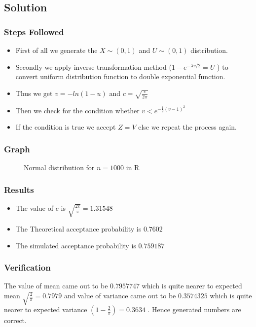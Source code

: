\documentclass[10pt]{article}
\begin{document}
\subsection{Solution}
\subsubsection{Steps Followed}
\begin{itemize}
\item First of all we generate the  $ X \sim  (0,1) $ and $ U \sim  (0,1) $ distribution.
\item Secondly we apply inverse transformation method ($ 1 - e^{-{\lambda}v/2} = U $ )   to convert uniform distribution function to double exponential  function.
\item Thus we get $ v= -ln(1-u) $ and  $ c= {\sqrt{\frac{e}{2\pi}}}$
\item Then we check for the condition  whether $ v< e^{-{\frac{1}{2}}(v-1)^2} $
\item If the condition is true we accept $ Z=V $ else we repeat the process again.
\end{itemize}
\enlargethispage*{1000pt}
\subsubsection{Graph}
\begin{figure}[H]
		\centering
		\caption{Normal distribution for $ n=1000 $ in R}
		\label{fig:q2_f1_a}
\end{figure}
\pagebreak


\subsubsection{Results}
\begin{itemize}
\item The value of c  is $\sqrt{\frac{2e}{\pi}} = 1.31548$
\item The Theoretical acceptance probability  is $0.7602$
\item The simulated acceptance probability is $0.759187$
\end{itemize}

\subsubsection{Verification}
The value of mean came out to be $ 0.7957747 $ which is quite nearer to expected mean $ \sqrt{\frac{2}{\pi}} = 0.7979 $ and value of variance came out to be $ 0.3574325 $ which is quite nearer to expected variance $(1-\frac{2}{\pi}) = 0.3634 $ . Hence generated numbers are correct.
\end{document}
